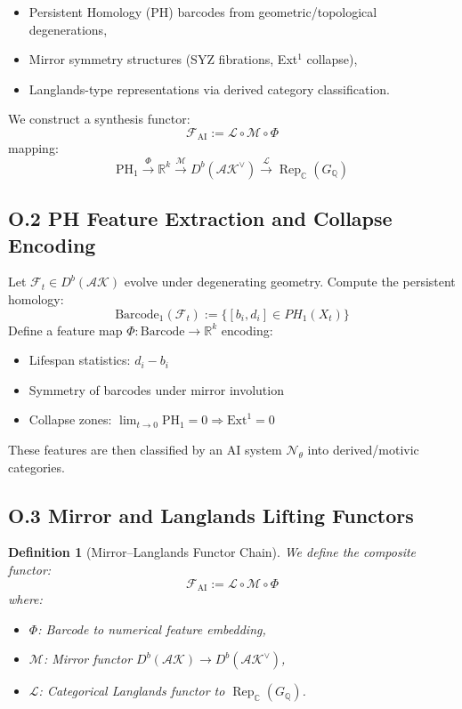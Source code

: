 \documentclass[11pt]{article}
\newtheorem{definition}[theorem]{Definition}
\begin{document}
\begin{itemize}
  \item Persistent Homology (PH) barcodes from geometric/topological degenerations,
  \item Mirror symmetry structures (SYZ fibrations, Ext$^1$ collapse),
  \item Langlands-type representations via derived category classification.
\end{itemize}

We construct a synthesis functor:
\[
\mathscr{F}_{\mathrm{AI}} := \mathcal{L} \circ \mathcal{M} \circ \Phi
\]
mapping:
\[
\mathrm{PH}_1 \xrightarrow{\Phi} \mathbb{R}^k \xrightarrow{\mathcal{M}} D^b(\mathcal{AK}^\vee) \xrightarrow{\mathcal{L}} \operatorname{Rep}_{\mathbb{C}}(G_{\mathbb{Q}})
\]

\subsection*{O.2 PH Feature Extraction and Collapse Encoding}

Let \( \mathcal{F}_t \in D^b(\mathcal{AK}) \) evolve under degenerating geometry.  
Compute the persistent homology:
\[
\mathrm{Barcode}_1(\mathcal{F}_t) := \{ [b_i, d_i] \in PH_1(X_t) \}
\]
Define a feature map \( \Phi: \mathrm{Barcode} \to \mathbb{R}^k \) encoding:
\begin{itemize}
  \item Lifespan statistics: \( d_i - b_i \)
  \item Symmetry of barcodes under mirror involution
  \item Collapse zones: \( \lim_{t \to 0} \mathrm{PH}_1 = 0 \Rightarrow \mathrm{Ext}^1 = 0 \)
\end{itemize}

These features are then classified by an AI system \( \mathcal{N}_\theta \) into derived/motivic categories.

\subsection*{O.3 Mirror and Langlands Lifting Functors}

\begin{definition}[Mirror–Langlands Functor Chain]
We define the composite functor:
\[
\mathscr{F}_{\mathrm{AI}} := \mathcal{L} \circ \mathcal{M} \circ \Phi
\]
where:
\begin{itemize}
  \item \( \Phi \): Barcode to numerical feature embedding,
  \item \( \mathcal{M} \): Mirror functor \( D^b(\mathcal{AK}) \to D^b(\mathcal{AK}^\vee) \),
  \item \( \mathcal{L} \): Categorical Langlands functor to \( \operatorname{Rep}_{\mathbb{C}}(G_{\mathbb{Q}}) \).
\end{itemize}
\end{definition}
\end{document}

